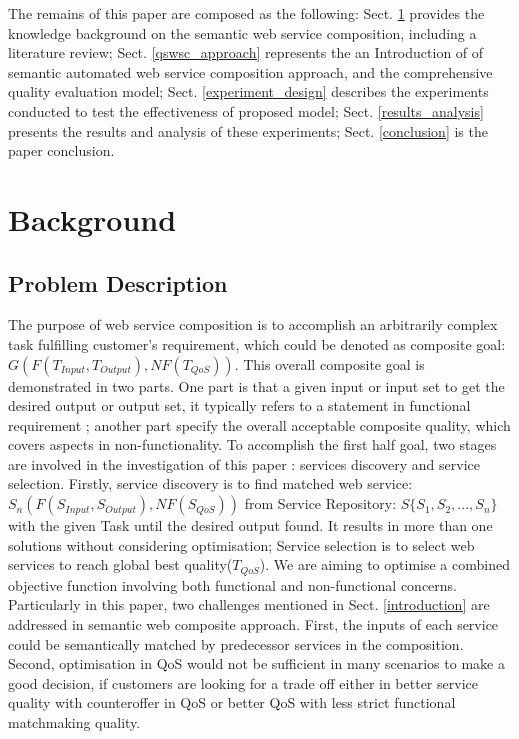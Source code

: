 \documentclass{llncs}
\begin{document}
The remains of this paper are composed as the following: Sect. \ref{background} provides the knowledge background on the semantic web service composition, including a literature review; Sect. \ref{qswsc_approach} represents the an Introduction of of semantic automated web service composition approach, and the comprehensive quality evaluation model; Sect. \ref{experiment_design} describes the experiments conducted to test the effectiveness of proposed model; Sect. \ref{results_analysis} presents the results and analysis of these experiments; Sect. \ref{conclusion} is the paper conclusion.


\section{Background}\label{background}

\subsection{Problem Description}\label{problemDes}

The purpose of web service composition is to accomplish an arbitrarily complex task fulfilling customer's requirement, which could be denoted as composite goal: $G(F(T_{Input}, T_{Output}), NF(T_{QoS}))$. This overall composite goal is demonstrated in two parts. One part is that a given input or input set to get the desired output or output set, it typically refers to a statement in functional requirement ; another part specify the overall acceptable composite quality, which covers aspects in non-functionality. To accomplish the first half goal, two stages are involved in the investigation of this paper : services discovery and service selection. Firstly, service discovery is to find matched web service: $S_{n}(F(S_{Input}, S_{Output}), NF(S_{QoS}))$ from Service Repository: $S \{S_{1}, S_{2},..., S_{n} \}$ with the given Task until the desired output found. It results in more than one solutions without considering optimisation; Service selection is to select web services to reach global best quality($T_{QoS}$). We are aiming to optimise a combined objective function involving both functional and non-functional concerns. Particularly in this paper, two challenges mentioned in Sect. \ref{introduction} are addressed in semantic web composite approach. First, the inputs of each service could be semantically matched by predecessor services in the composition. Second, optimisation in QoS would not be sufficient in many scenarios to make a good decision, if customers are looking for a trade off either in better service quality with counteroffer in QoS or better QoS with less strict functional matchmaking quality.
\end{document}
